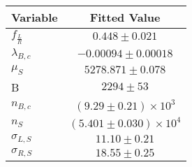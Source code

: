 \begin{tabular}[t]{lc}
\hline
Variable &Fitted Value\\
\hline\hline
$f_{\frac{L}{R}}$&$0.448\pm0.021$\\
\hline
$\lambda_{B,c}$&$-0.00094\pm0.00018$\\
\hline
$\mu_S$&$5278.871\pm0.078$\\
\hline
B&$2294\pm53$\\
\hline
$n_{B,c}$&$(9.29\pm0.21)\times 10^3$\\
\hline
$n_S$&$(5.401\pm0.030)\times 10^4$\\
\hline
$\sigma_{L, S}$&$11.10\pm0.21$\\
\hline
$\sigma_{R, S}$&$18.55\pm0.25$\\
\hline
\end{tabular}